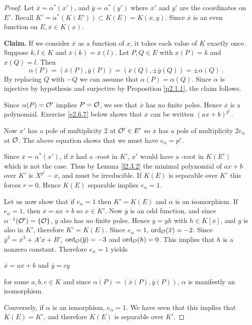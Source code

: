 \begin{proof}
Let $\overline{x}=\alpha^{*}(x')$, and $\overline{y}=\alpha^{*}(y')$ where $x'$ and $y'$ are the coordinates on $E'$. Recall $K'=\alpha^{*}(K(E'))\subset K(E)=K(x, y)$. Since $\overline{x}$ is an even function on $E,\overline{x}\in K(x)$.

\textbf{Claim.} If we consider $\overline{x}$ as a function of $x$, it takes each value of $K$ exactly once. Suppose $k,l \in K$ and $\overline{x}(k)=\overline{x}(l)$. Let $P,Q\in E$ with $x(P)=k$ and $x(Q)=l$. Then
$$
\alpha(P)=(\overline{x}(P),\overline{y}(P))=(\overline{x}(Q),\pm\overline{y}(Q))=\pm\alpha(Q)\ .
$$
By replacing $Q$ with $-Q$ we can assume that $\alpha(P)=\alpha(Q)$. Since $\alpha$ is injective by hypothesis and surjective by Proposition \ref{p2.1.1}, the claim follows.

Since $\alpha(P)=\mathcal{O}'$ implies $P=\mathcal{O}$, we see that $\overline{x}$ has no finite poles. Hence $\overline{x}$ is a polynomial. Exercise \ref{e2.6.7} below shows that $\overline{x}$ can be written $(ax+b)^{p^{r}}$.


Now $x'$ has a pole of multiplicity 2 at $\mathcal{O}'\in E'$ so $\overline{x}$ has a pole of multiplicity $2e_{\alpha}$ at $\mathcal{O}$. The above equation shows that we must have $e_{\alpha}=p^{r}$.


Since $\overline{x}=\alpha^{*}(x')$, if $\overline{x}$ had a -root in $K'$, $x'$ would have a -root in $K(E')$ which is not the case. Thus by Lemma \ref{l2.3.2} the minimal polynomial of $ax+b$ over $K'$ is $X^{p^{r}}-\overline{x}$, and must be irreducible. If $K(E)$ is separable over $K'$ this forces $r=0$.
Hence $K(E)$ separable implies $e_{\alpha}=1$. 

Let us now show that if $e_{\alpha}=1$ then $K'=K(E)$ and $\alpha$ is an isomorphism. If $e_{\alpha}=1$, then $\overline{x}=ax+b$ so $x\in K'$. Now $\overline{y}$ is an odd function, and since $\alpha^{-1}(\mathcal{O}')=\{\mathcal{O}\}$, $\overline{y}$ also has no finite poles. Hence $\overline{y}=yh$ with $h\in K[x]$, and $y$ is also in $K'$, therefore $K'=K(E)$. Since $e_{\alpha}=1$, $\operatorname{ord}_{\mathcal{O}}(\overline{x})=-2$. Since $\overline{y}^{2}=\overline{x}^{3}+A'\overline{x}+B'$, $\operatorname{ord}_{\mathcal{O}}(\overline{y})=-3$ and $\operatorname{ord}_{\mathcal{O}}(h)=0$. This implies that $h$ is a nonzero constant. Therefore $e_{\alpha}=1$ yields
\begin{center}
$\overline{x}=ax+b$ and $\overline{y}=cy$
\end{center}
for some $a,b,c\in K$ and since $\alpha(P)=(\overline{x}(P),\overline{y}(P))$, $\alpha$ is manifestly an isomorphism.

Conversely, if $\alpha$ is an ismorphism, $e_{\alpha}=1$. We have seen that this implies that $K(E) = K'$, and therefore $K(E)$ is separable over $K'$.

\end{proof}

